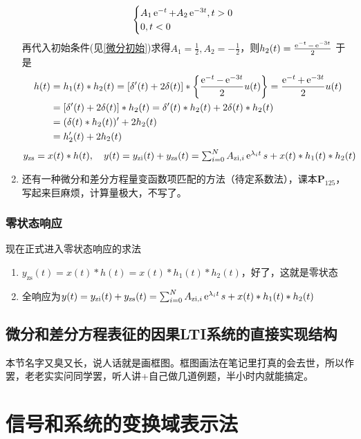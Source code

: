 \documentclass{article}
\newcommand\zi{\mathrm{zi}}
\newcommand\zs{\mathrm{zs}}
\begin{document}
\begin{enumerate}[label=(\arabic*)]
\begin{example}
\[\begin{cases}
						A_1\operatorname{e}^{-t}+A_2\operatorname{e}^{-3t}, t>0 \\
						0, t<0
					\end{cases}\]
					再代入初始条件(见\eqref{微分初始})求得$A_1=\frac{1}{2},A_2=-\frac{1}{2}$，则$h_2(t) = \frac{\operatorname{e}^{-t}-\operatorname{e}^{-3t}}{2}$
					于是\[\begin{aligned}
						h(t) &= h_1(t)*h_2(t) = [\delta'(t)+2\delta(t)]*\left\{\frac{\operatorname{e}^{-t}-\operatorname{e}^{-3t}}{2}u(t)\right\} = \frac{\operatorname{e}^{-t}+\operatorname{e}^{-3t}}{2}u(t)\\
						&= [\delta'(t)+2\delta(t)]*h_2(t) = \delta'(t)*h_2(t)+2\delta(t)*h_2(t)\\
						&= (\delta(t)*h_2(t))' + 2h_2(t)\\
						&= h_2'(t) + 2h_2(t)
					\end{aligned}\]
					$y_{\zs} = x(t)*h(t),\quad y(t) = y_{\zi}(t)+y_{\zs}(t) = \sum_{i=0}^{N}A_{\zi,i}\e^{\lambda_i t}s+x(t)*h_1(t)*h_2(t)$
				\end{example}
	\item 还有一种微分和差分方程量变函数项匹配的方法（待定系数法），课本$\mathbf{P}_{125}$，写起来巨麻烦，计算量极大，不写了。
\end{enumerate}
\subsubsection{零状态响应}
现在正式进入零状态响应的求法
\begin{enumerate}[label=(\arabic*)]
	\item $y_{\zs}(t) = x(t)*h(t) = x(t)*h_1(t)*h_2(t)$，好了，这就是零状态
	\item 全响应为$y(t) = y_{\zi}(t)+y_{\zs}(t) = \sum_{i=0}^{N}A_{\zi,i}\e^{\lambda_i t}s+x(t)*h_1(t)*h_2(t)$
\end{enumerate}

\subsection{微分和差分方程表征的因果LTI系统的直接实现结构}
本节名字又臭又长，说人话就是画框图。框图画法在笔记里打真的会去世，所以作罢，老老实实问同学罢，听人讲+自己做几道例题，半小时内就能搞定。

\section{信号和系统的变换域表示法}
\end{document}
